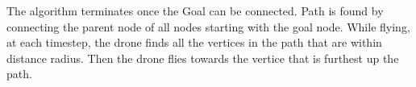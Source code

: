 The algorithm terminates once the Goal can be connected.
Path is found by connecting the parent node of all nodes starting with the goal node.
While flying, at each timestep, the drone finds all the vertices in the path that are within distance radius.
Then the drone flies towards the vertice that is furthest up the path.